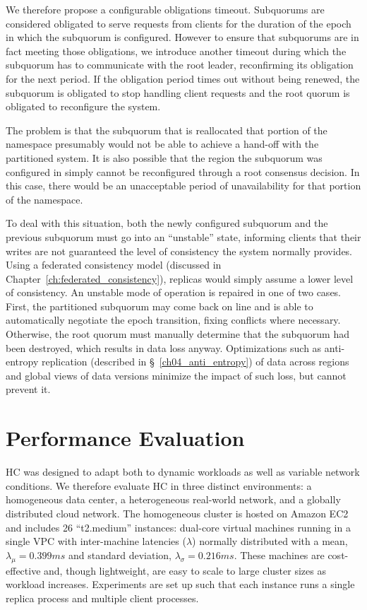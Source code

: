 We therefore propose a configurable obligations timeout.
Subquorums are considered obligated to serve requests from clients for the duration of the epoch in which the subquorum is configured.
However to ensure that subquorums are in fact meeting those obligations, we introduce another timeout during which the subquorum has to communicate with the root leader, reconfirming its obligation for the next period.
If the obligation period times out without being renewed, the subquorum is obligated to stop handling client requests and the root quorum is obligated to reconfigure the system.

The problem is that the subquorum that is reallocated that portion of the namespace presumably would not be able to achieve a hand-off with the partitioned system.
It is also possible that the region the subquorum was configured in simply cannot be reconfigured through a root consensus decision.
In this case, there would be an unacceptable period of unavailability for that portion of the namespace.

To deal with this situation, both the newly configured subquorum and the previous subquorum must go into an ``unstable'' state, informing clients that their writes are not guaranteed the level of consistency the system normally provides.
Using a federated consistency model (discussed in Chapter~\ref{ch:federated_consistency}), replicas would simply assume a lower level of consistency.
An unstable mode of operation is repaired in one of two cases.
First, the partitioned subquorum may come back on line and is able to automatically negotiate the epoch transition, fixing conflicts where necessary.
Otherwise, the root quorum must manually determine that the subquorum had been destroyed, which results in data loss anyway.
Optimizations such as anti-entropy replication (described in \S~\ref{ch04_anti_entropy}) of data across regions and global views of data versions minimize the impact of such loss, but cannot prevent it.

\section{Performance Evaluation}
\label{ch03_evaluation}

HC was designed to adapt both to dynamic workloads as well as variable network conditions.
We therefore evaluate HC in three distinct environments: a homogeneous data center, a heterogeneous real-world network, and a globally distributed cloud network.
The homogeneous cluster is hosted on Amazon EC2 and includes 26 ``t2.medium'' instances: dual-core virtual machines running in a single VPC with inter-machine latencies ($\lambda$) normally distributed with a mean, $\lambda_{\mu}=0.399ms$ and standard deviation, $\lambda_{\sigma}=0.216ms$.
These machines are cost-effective and, though lightweight, are easy to scale to large cluster sizes as workload increases.
Experiments are set up such that each instance runs a single replica process and multiple client processes.

